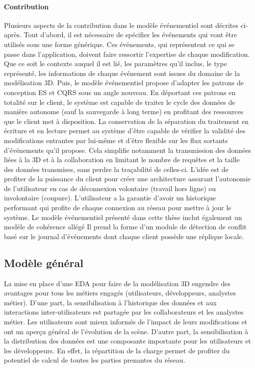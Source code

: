 \paragraph{Contribution}
Plusieurs aspects de la contribution dans le modèle événementiel sont décrites ci-après. 
Tout d'abord, il est nécessaire de spécifier les événements qui vont être utilisés
sous une forme générique. Ces événements, qui représentent ce qui se passe dans l'application, 
doivent faire ressortir l'expertise de chaque modification. Que ce soit le contexte 
auquel il est lié, les paramètres qu'il inclus, le type représenté, les informations de chaque événement
sont issues du domaine de la modélisation 3D. 
Puis, le modèle événementiel propose d'adapter les patrons de conception 
\gls{ES} et \gls{CQRS} sous un angle nouveau.
En déportant ces patrons en totalité sur le client, le système est capable de traiter 
le cycle des données de manière autonome (sauf la sauvegarde à long terme) en profitant des
ressources que le client met à disposition. La conservation de la séparation du traitement 
en écriture et en lecture permet au système d'être capable de vérifier la validité des 
modifications entrantes par lui-même et d'être flexible sur les flux sortants d'événements qu'il propose.
Cela simplifie notamment la transmission des données liées à la \gls{3D} et à la collaboration en limitant le 
nombre de requêtes et la taille des données transmises, sans perdre la traçabilité de 
celles-ci. L'idée est de profiter de la puissance du client pour créer une 
architecture assurant l'autonomie de l'utilisateur en cas de déconnexion volontaire 
(travail hors ligne) ou involontaire (coupure). L'utilisateur a la garantie d'avoir 
un historique performant qui profite de chaque connexion au réseau  pour mettre à jour le système.
Le modèle événementiel présenté dans cette thèse inclut également un modèle de cohérence allégé 
Il prend la forme d'un module de détection de conflit basé sur le journal d'événements dont chaque 
client possède une réplique locale.

\subsection{Modèle général}
La mise en place d'une \gls{EDA} pour faire de la modélisation \gls{3D} engendre des 
avantages pour tous les métiers engagés (utilisateurs, développeurs, analystes métier).
D'une part, la sensibilisation à l'historique des données et aux interactions 
inter-utilisateurs est partagée par les collaborateurs et les analystes métier. 
Les utilisateurs sont mieux informés de l'impact de leurs modifications et 
ont un aperçu général de l'évolution de la scène. D'autre part, 
la sensibilisation à la distribution des données est une composante 
importante pour les utilisateurs et les développeurs. En effet, la répartition 
de la charge permet de profiter du potentiel de calcul de toutes les parties 
prenantes du réseau. 

